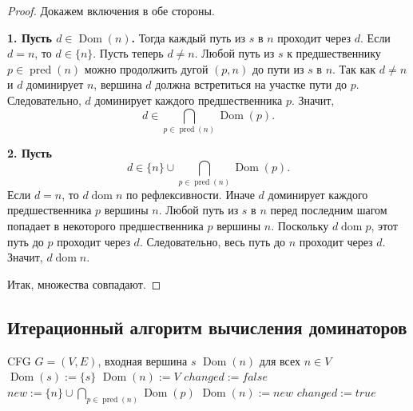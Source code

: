 \documentclass[12pt,a4paper]{article}
\DeclareMathOperator{\dom}{dom}
\DeclareMathOperator{\pred}{pred}
\DeclareMathOperator{\Dom}{Dom}
\begin{document}
\begin{proof}
Докажем включения в обе стороны.

\textbf{1. Пусть $d\in \Dom(n)$.}
Тогда каждый путь из $s$ в $n$ проходит через $d$.
Если $d=n$, то $d\in \{n\}$.
Пусть теперь $d\neq n$.
Любой путь из $s$ к предшественнику $p\in\pred(n)$ можно продолжить дугой $(p,n)$ до пути из $s$ в $n$.
Так как $d\neq n$ и $d$ доминирует $n$, вершина $d$ должна встретиться на участке пути до $p$.
Следовательно, $d$ доминирует каждого предшественника $p$.
Значит,
\[
d\in \bigcap_{p\in\pred(n)} \Dom(p).
\]

\textbf{2. Пусть}
\[
d\in \{n\}\cup \bigcap_{p\in\pred(n)} \Dom(p).
\]
Если $d=n$, то $d\dom n$ по рефлексивности.
Иначе $d$ доминирует каждого предшественника $p$ вершины $n$.
Любой путь из $s$ в $n$ перед последним шагом попадает в некоторого предшественника $p$ вершины $n$.
Поскольку $d\dom p$, этот путь до $p$ проходит через $d$.
Следовательно, весь путь до $n$ проходит через $d$.
Значит, $d\dom n$.

Итак, множества совпадают.
\end{proof}

\subsection{Итерационный алгоритм вычисления доминаторов}

\begin{algorithm}[H]
\caption{Итерационное вычисление множеств доминаторов}
\begin{algorithmic}[1]
\Require CFG $G=(V,E)$, входная вершина $s$
\Ensure $\Dom(n)$ для всех $n\in V$
\State $\Dom(s) := \{s\}$
    \State $\Dom(n) := V$
\EndFor
\Repeat
    \State $changed := false$
        \State $new := \{n\} \cup \bigcap_{p\in\pred(n)} \Dom(p)$
        \If{$new \neq \Dom(n)$}
            \State $\Dom(n):=new$
            \State $changed := true$
        \EndIf
    \EndFor
{}
\end{algorithmic}
\end{algorithm}
\end{document}
